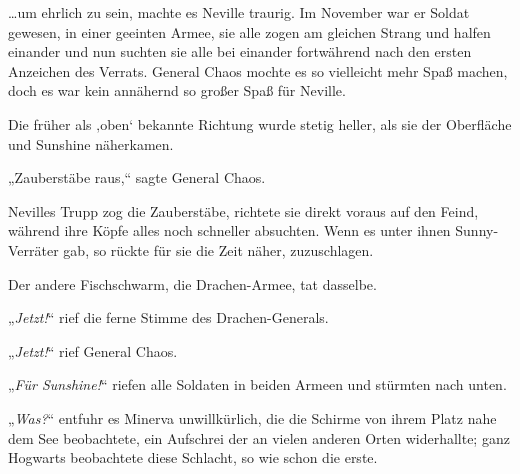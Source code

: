 …um ehrlich zu sein, machte es Neville traurig. Im November war er Soldat gewesen, in einer geeinten Armee, sie alle zogen am gleichen Strang und halfen einander und nun suchten sie alle bei einander fortwährend nach den ersten Anzeichen des Verrats. General Chaos mochte es so vielleicht mehr Spaß machen, doch es war kein annähernd so großer Spaß für Neville.

Die früher als ‚oben‘ bekannte Richtung wurde stetig heller, als sie der Oberfläche und Sunshine näherkamen.

„Zauberstäbe raus,“ sagte General Chaos.

Nevilles Trupp zog die Zauberstäbe, richtete sie direkt voraus auf den Feind, während ihre Köpfe alles noch schneller absuchten. Wenn es unter ihnen Sunny-Verräter gab, so rückte für sie die Zeit näher, zuzuschlagen.

Der andere Fischschwarm, die Drachen-Armee, tat dasselbe.

„\emph{Jetzt!}“ rief die ferne Stimme des Drachen-Generals.

„\emph{Jetzt!}“ rief General Chaos.

„\emph{Für Sunshine!}“ riefen alle Soldaten in beiden Armeen und stürmten nach unten.

\later

„\emph{Was?}“ entfuhr es Minerva unwillkürlich, die die Schirme von ihrem Platz nahe dem See beobachtete, ein Aufschrei der an vielen anderen Orten widerhallte; ganz Hogwarts beobachtete diese Schlacht, so wie schon die erste.

